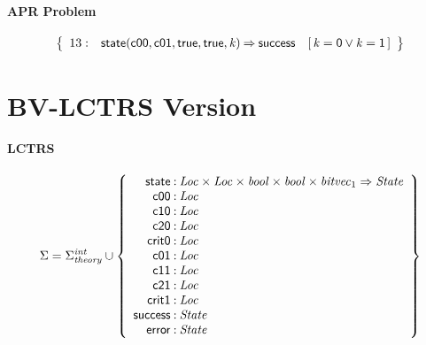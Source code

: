 \documentclass[a4paper]{article}
\newcommand{\Sort}[1]{\mathit{#1}}
\newcommand{\symb}[1]{\mathsf{#1}}
\newcommand{\var}[1]{\mathit{#1}}
\newcommand{\Constraint}[1]{[\, #1 \,]}
\newcommand{\Sigmainttheory}{\Sigma^{\mathit{int}}_{\mathit{theory}}}
\begin{document}
\paragraph{APR Problem}

\[
\left\{
\begin{array}{rr@{\>}c@{\>}ll}
\mathrm{13} : 
 & \symb{state}(\symb{c00},\symb{c01},\symb{true},\symb{true},\var{k})
 & \Rightarrow 
 & \symb{success}
 & \Constraint{\var{k} = \symb{0} \lor \var{k} = \symb{1}} \\

\end{array}
\right\}
\]


\newpage
\section*{BV-LCTRS Version}


\paragraph{LCTRS}

\[
\Sigma = 
\Sigmainttheory \cup\left\{
\begin{array}{r@{\>}c@{\>}l}
\symb{state} & : & \Sort{Loc} \times \Sort{Loc} \times \Sort{bool} \times \Sort{bool} \times \Sort{bitvec}_{1} \Rightarrow \Sort{State}\\
\symb{c00} & : & \Sort{Loc}\\
\symb{c10} & : & \Sort{Loc}\\
\symb{c20} & : & \Sort{Loc}\\
\symb{crit0} & : & \Sort{Loc}\\
\symb{c01} & : & \Sort{Loc}\\
\symb{c11} & : & \Sort{Loc}\\
\symb{c21} & : & \Sort{Loc}\\
\symb{crit1} & : & \Sort{Loc}\\
\symb{success} & : & \Sort{State}\\
\symb{error} & : & \Sort{State}\\
\end{array}
\right\}
\]
\end{document}
